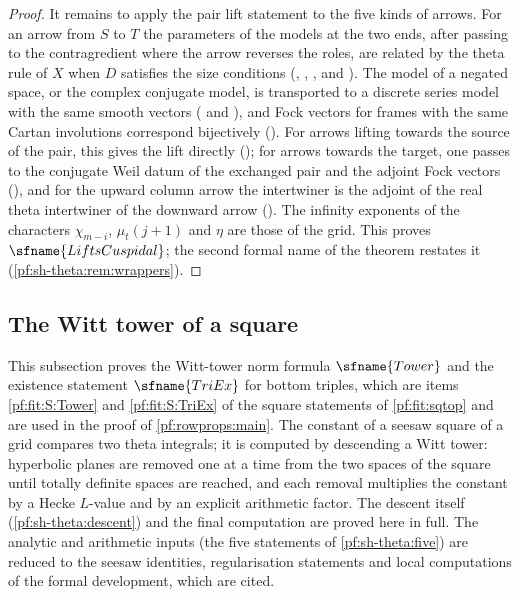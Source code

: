\begin{proof}
It remains to apply the pair lift statement to the five kinds of arrows. For an arrow from $S$ to $T$ the parameters of the models
at the two ends, after passing to the contragredient where the arrow reverses the roles, are related by the theta rule of $X$ when
$D$ satisfies the size conditions (, , , and ).
The model of a negated space, or the complex conjugate model, is transported to a discrete series model with the same smooth
vectors ( and ),
and Fock vectors for frames with the same Cartan involutions correspond bijectively
(). For arrows lifting towards the source of the pair, this gives
the lift directly (); for arrows towards the target, one passes to the conjugate
Weil datum of the exchanged pair and the adjoint Fock vectors (), and for the
upward column arrow the intertwiner is the adjoint of the real theta intertwiner of the downward arrow
(). The infinity exponents of the characters
$\chi_{m-i}$, $\mu_t(j+1)$ and $\eta$ are those of the grid. This proves $\sfname{LiftsCuspidal}$; the second formal name of the
theorem restates it (\cref{pf:sh-theta:rem:wrappers}).
\end{proof}

\subsection{The Witt tower of a square}\label{sec:pf:sh-theta:tower}

This subsection proves the Witt-tower norm formula $\sfname{Tower}$ and the existence statement $\sfname{TriEx}$ for bottom
triples, which are items \ref{pf:fit:S:Tower} and \ref{pf:fit:S:TriEx} of the square statements of \cref{pf:fit:sqtop}
and are used in the proof of \cref{pf:rowprops:main}. The constant of a seesaw square of a grid compares two
theta integrals; it is computed by descending a Witt tower: hyperbolic planes are removed one at a time from the two spaces
of the square until totally definite spaces are reached, and each removal multiplies the constant by a Hecke $L$-value
and by an explicit arithmetic factor. The descent itself (\cref{pf:sh-theta:descent}) and the final computation are
proved here in full. The analytic and arithmetic inputs (the five statements of \cref{pf:sh-theta:five}) are reduced
to the seesaw identities, regularisation statements and local computations of the formal development, which are cited.

